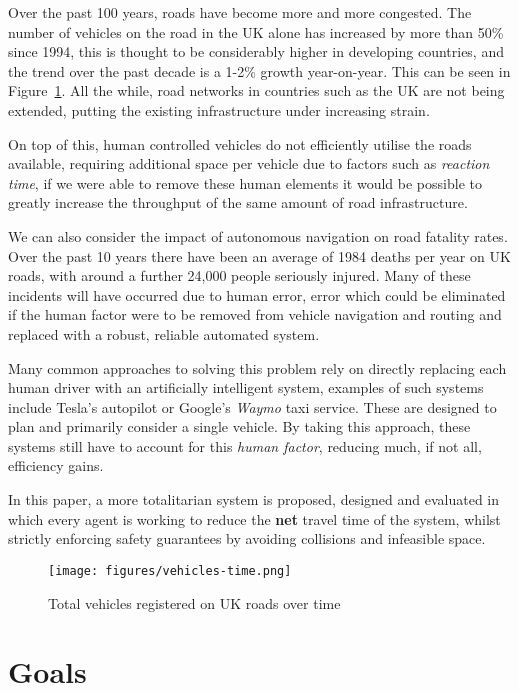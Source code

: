 
Over the past 100 years, roads have become more and more congested. The number of vehicles on the road in the UK alone has increased by more than 50\% since 1994\cite{AllVehiclesVEH01}, this is thought to be considerably higher in developing countries, and the trend over the past decade is a 1-2\% growth year-on-year. This can be seen in Figure~\ref{fig:vehicles-time}. All the while, road networks in countries such as the UK are not being extended, putting the existing infrastructure under increasing strain.

On top of this, human controlled vehicles do not efficiently utilise the roads available, requiring additional space per vehicle due to factors such as \textit{reaction time}, if we were able to remove these human elements it would be possible to greatly increase the throughput of the same amount of road infrastructure.

We can also consider the impact of autonomous navigation on road fatality rates. Over the past 10 years there have been an average of 1984 deaths per year on UK roads\cite{ReportedRoadCasualties}, with around a further 24,000 people seriously injured. Many of these incidents will have occurred due to human error, error which could be eliminated if the human factor were to be removed from vehicle navigation and routing and replaced with a robust, reliable automated system.

Many common approaches to solving this problem rely on directly replacing each human driver with an artificially intelligent system, examples of such systems include Tesla's autopilot or Google's \textit{Waymo} taxi service. These are designed to plan and primarily consider a single vehicle. By taking this approach, these systems still have to account for this \textit{human factor}, reducing much, if not all, efficiency gains.

In this paper, a more totalitarian system is proposed, designed and evaluated in which every agent is working to reduce the \textbf{net} travel time of the system, whilst strictly enforcing safety guarantees by avoiding collisions and infeasible space.


\begin{figure}[ht]
  \centering
  \texttt{[image: figures/vehicles-time.png]}
  \caption{\label{fig:vehicles-time} Total vehicles registered on UK roads over time\cite{AllVehiclesVEH01}}
\end{figure}


\section{Goals}

